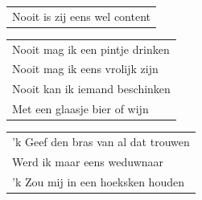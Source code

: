 \documentclass{article}
\begin{document}
\begin{flushleft}
\begin{tabularx}{0.8\textwidth} {
   >{\raggedright\arraybackslash}X}
Nooit is zij eens wel content\\
\end{tabularx}
\end{flushleft}\begin{flushleft}
\begin{tabularx}{0.8\textwidth} {
   >{\raggedright\arraybackslash}X}
Nooit mag ik een pintje drinken\\
Nooit mag ik eens vrolijk zijn\\
Nooit kan ik iemand beschinken\\
Met een glaasje bier of wijn\\
\end{tabularx}
\end{flushleft}\begin{flushleft}
\begin{tabularx}{0.8\textwidth} {
   >{\raggedright\arraybackslash}X}
’k Geef den bras van al dat trouwen\\
Werd ik maar eens weduwnaar\\
’k Zou mij in een hoeksken houden\\
\end{tabularx}
\end{flushleft}
\end{document}
